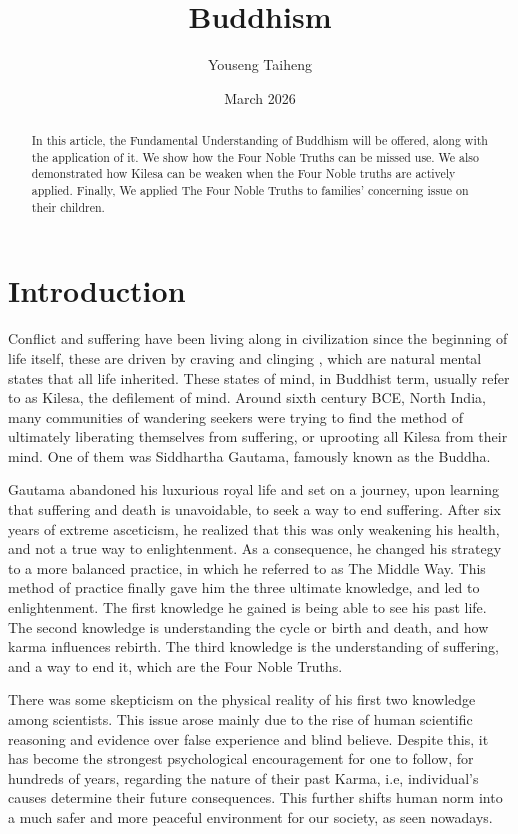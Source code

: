 \documentclass[12pt,a4paper]{article}
\begin{document}
	
	\title{Buddhism}
	\author{Youseng Taiheng}
	\date{March 2026} %
	\maketitle

\begin{abstract}
	In this article, the Fundamental Understanding of Buddhism will be offered, along with the application of it. We show how the Four Noble Truths can be missed use. We also demonstrated how Kilesa can be weaken when the Four Noble truths are actively applied. Finally, We applied The Four Noble Truths to families' concerning issue on their children.
\end{abstract}

	\section{Introduction}
	Conflict and suffering have been living along in civilization since the beginning of life itself, these are driven by craving and clinging \cite{matthews1974concept}, which are natural mental states that all life inherited. These states of mind, in Buddhist term, usually refer to as Kilesa, the defilement of mind. Around sixth century BCE, North India, many communities of wandering seekers were trying to find the method of ultimately liberating themselves from suffering, or uprooting all Kilesa from their mind. One of them was Siddhartha Gautama, famously known as the Buddha.
	
	Gautama abandoned his luxurious royal life and set on a journey, upon learning that suffering and death is unavoidable, to seek a way to end suffering. After six years of extreme asceticism, he realized that this was only weakening his health, and not a true way to enlightenment. As a consequence, he changed his strategy to a more balanced practice, in which he referred to as The Middle Way. This method of practice finally gave him the three ultimate knowledge, and led to enlightenment. The first knowledge he gained is being able to see his past life. The second knowledge is understanding the cycle or birth and death, and how karma influences rebirth. The third knowledge is the understanding of suffering, and a way to end it, which are the Four Noble Truths. \cite{sarao1989origin}
	
	There was some skepticism on the physical reality of his first two knowledge among scientists. This issue arose mainly due to the rise of human scientific reasoning and evidence over false experience and blind believe. Despite this, it has become the strongest psychological encouragement for one to follow, for hundreds of years, regarding the nature of their past Karma, i.e, individual's causes determine their future consequences. This further shifts human norm into a much safer and more peaceful environment for our society, as seen nowadays. \cite{jayatilleke1969survival} 
	 
\end{document}
